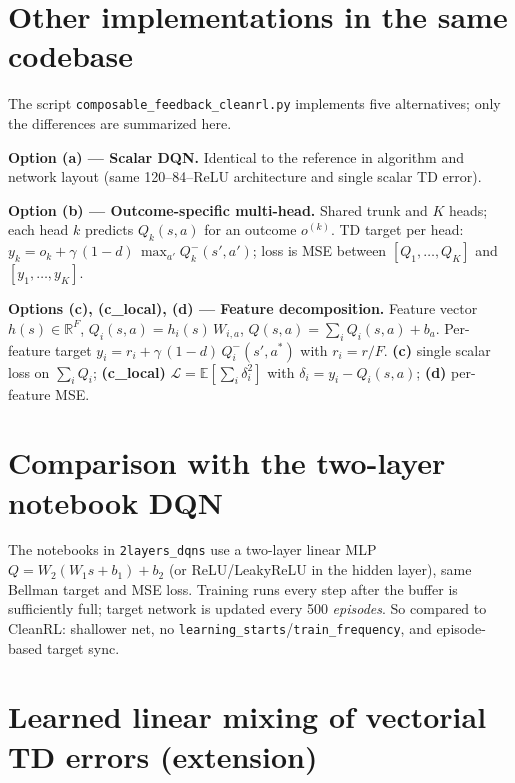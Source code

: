 \documentclass[11pt]{article}
\begin{document}
\section{Other implementations in the same codebase}

The script \texttt{composable\_feedback\_cleanrl.py} implements five alternatives; only the differences are summarized here.

\textbf{Option (a) — Scalar DQN.} Identical to the reference in algorithm and network layout (same 120–84–ReLU architecture and single scalar TD error).

\textbf{Option (b) — Outcome-specific multi-head.} Shared trunk and $K$ heads; each head $k$ predicts $Q_k(s,a)$ for an outcome $o^{(k)}$. TD target per head: $y_k = o_k + \gamma\,(1-d)\,\max_{a'} Q_k^-(s',a')$; loss is MSE between $[Q_1,\ldots,Q_K]$ and $[y_1,\ldots,y_K]$.

\textbf{Options (c), (c\_local), (d) — Feature decomposition.} Feature vector $h(s) \in \mathbb{R}^F$, $Q_i(s,a) = h_i(s)\,W_{i,a}$, $Q(s,a) = \sum_i Q_i(s,a) + b_a$. Per-feature target $y_i = r_i + \gamma\,(1-d)\,Q_i^-(s',a^*)$ with $r_i = r/F$. \textbf{(c)} single scalar loss on $\sum_i Q_i$; \textbf{(c\_local)} $\mathcal{L} = \mathbb{E}[\sum_i \delta_i^2]$ with $\delta_i = y_i - Q_i(s,a)$; \textbf{(d)} per-feature MSE.

\section{Comparison with the two-layer notebook DQN}

The notebooks in \texttt{2layers\_dqns} use a two-layer linear MLP $Q = W_2(W_1 s + b_1) + b_2$ (or ReLU/LeakyReLU in the hidden layer), same Bellman target and MSE loss. Training runs every step after the buffer is sufficiently full; target network is updated every 500 \emph{episodes}. So compared to CleanRL: shallower net, no \texttt{learning\_starts}/\texttt{train\_frequency}, and episode-based target sync.

\section{Learned linear mixing of vectorial TD errors (extension)}
\end{document}
